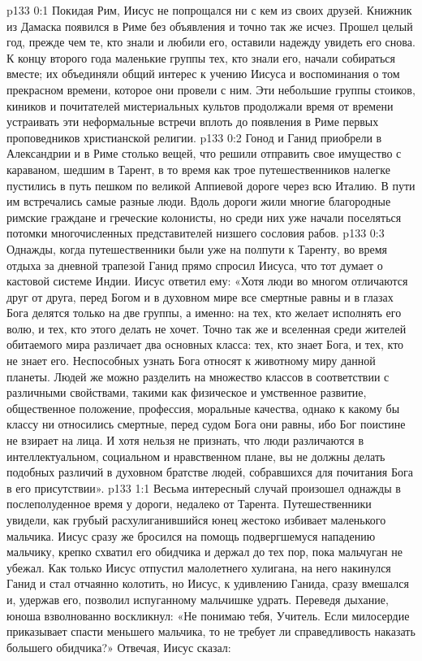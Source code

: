 \author{Комиссия срединников}
\vs p133 0:1 Покидая Рим, Иисус не попрощался ни с кем из своих друзей. Книжник из Дамаска появился в Риме без объявления и точно так же исчез. Прошел целый год, прежде чем те, кто знали и любили его, оставили надежду увидеть его снова. К концу второго года маленькие группы тех, кто знали его, начали собираться вместе; их объединяли общий интерес к учению Иисуса и воспоминания о том прекрасном времени, которое они провели с ним. Эти небольшие группы стоиков, киников и почитателей мистериальных культов продолжали время от времени устраивать эти неформальные встречи вплоть до появления в Риме первых проповедников христианской религии.
\vs p133 0:2 \pc Гонод и Ганид приобрели в Александрии и в Риме столько вещей, что решили отправить свое имущество с караваном, шедшим в Тарент, в то время как трое путешественников налегке пустились в путь пешком по великой Аппиевой дороге через всю Италию. В пути им встречались самые разные люди. Вдоль дороги жили многие благородные римские граждане и греческие колонисты, но среди них уже начали поселяться потомки многочисленных представителей низшего сословия рабов.
\vs p133 0:3 Однажды, когда путешественники были уже на полпути к Таренту, во время отдыха за дневной трапезой Ганид прямо спросил Иисуса, что тот думает о кастовой системе Индии. Иисус ответил ему: «Хотя люди во многом отличаются друг от друга, перед Богом и в духовном мире все смертные равны и в глазах Бога делятся только на две группы, а именно: на тех, кто желает исполнять его волю, и тех, кто этого делать не хочет. Точно так же и вселенная среди жителей обитаемого мира различает два основных класса: тех, кто знает Бога, и тех, кто не знает его. Неспособных узнать Бога относят к животному миру данной планеты. Людей же можно разделить на множество классов в соответствии с различными свойствами, такими как физическое и умственное развитие, общественное положение, профессия, моральные качества, однако к какому бы классу ни относились смертные, перед судом Бога они равны, ибо Бог поистине не взирает на лица. И хотя нельзя не признать, что люди различаются в интеллектуальном, социальном и нравственном плане, вы не должны делать подобных различий в духовном братстве людей, собравшихся для почитания Бога в его присутствии».
\vs p133 1:1 Весьма интересный случай произошел однажды в послеполуденное время у дороги, недалеко от Тарента. Путешественники увидели, как грубый расхулиганившийся юнец жестоко избивает маленького мальчика. Иисус сразу же бросился на помощь подвергшемуся нападению мальчику, крепко схватил его обидчика и держал до тех пор, пока мальчуган не убежал. Как только Иисус отпустил малолетнего хулигана, на него накинулся Ганид и стал отчаянно колотить, но Иисус, к удивлению Ганида, сразу вмешался и, удержав его, позволил испуганному мальчишке удрать. Переведя дыхание, юноша взволнованно воскликнул: «Не понимаю тебя, Учитель. Если милосердие приказывает спасти меньшего мальчика, то не требует ли справедливость наказать большего обидчика?» Отвечая, Иисус сказал:
